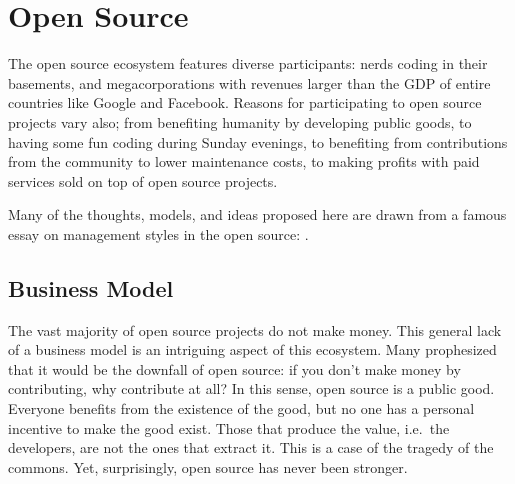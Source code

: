 \chapter{Open Source}
\label{sec:open_source}

The open source ecosystem%
features diverse participants: nerds coding in their basements, and megacorporations with revenues larger than the GDP of entire countries like Google and Facebook.
Reasons for participating to open source projects vary also; from benefiting humanity by developing public goods, to having some fun coding during Sunday evenings, to benefiting from contributions from the community to lower maintenance costs, to making profits with paid services sold on top of open source projects.

Many of the thoughts, models, and ideas proposed here are drawn from a famous essay on management styles in the open source:  \cite{raymond_cathedral_2001}.

\section{Business Model}

The vast majority of open source projects do not make money.
This general lack of a business model is an intriguing aspect of this ecosystem.
Many prophesized that it would be the downfall of open source: if you don't make money by contributing, why contribute at all?
In this sense, open source is a public good.
Everyone benefits from the existence of the good, but no one has a personal incentive to make the good exist.
Those that produce the value, i.e.\ the developers, are not the ones that extract it.
This is a case of the tragedy of the commons.
Yet, surprisingly, open source has never been stronger.


